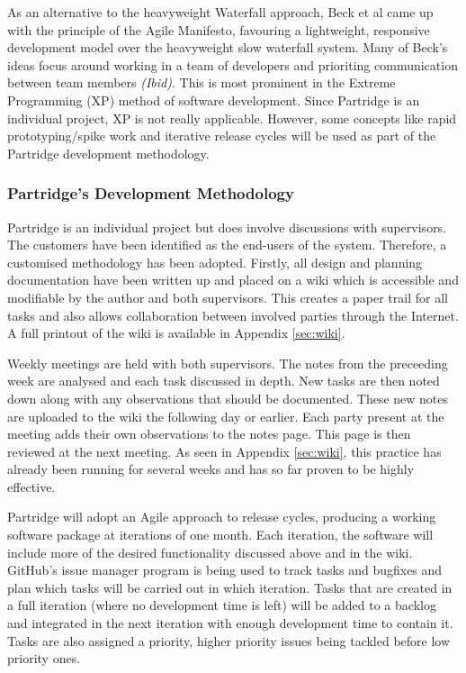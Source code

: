 \documentclass[12pt,a4paper]{article}
\begin{document}
As an alternative to the heavyweight Waterfall approach, Beck et al came up
with the principle of the Agile Manifesto, favouring a lightweight, responsive
development model over the heavyweight slow waterfall
system\cite{beck2001agile}. Many of Beck's ideas focus around working in a team
of developers and prioriting communication between team members \emph{(Ibid)}.
This is most prominent in the Extreme Programming (XP) method of software
development. Since Partridge is an individual project, XP is not really
applicable. However, some concepts like rapid prototyping/spike work and
iterative release cycles will be used as part of the Partridge development
methodology.

\subsubsection{ Partridge's Development Methodology}

Partridge is an individual project but does involve discussions with
supervisors. The customers have been identified as the end-users of the system.
Therefore, a customised methodology has been adopted. Firstly, all design and
planning documentation have been written up and placed on a wiki which is
accessible and modifiable by the author and both supervisors. This creates a
paper trail for all tasks and also allows collaboration between involved
parties through the Internet. A full printout of the wiki is available in
Appendix \ref{sec:wiki}. 

Weekly meetings are held with both supervisors. The notes from the preceeding
week are analysed and each task discussed in depth. New tasks are then noted
down along with any observations that should be documented. These new notes are
uploaded to the wiki the following day or earlier. Each party present at the
meeting adds their own observations to the notes page. This page is then
reviewed at the next meeting. As seen in Appendix \ref{sec:wiki}, this practice
has already been running for several weeks and has so far proven to be highly
effective.

Partridge will adopt an Agile approach to release cycles, producing a working
software package at iterations of one month.  Each iteration, the software will
include more of the desired functionality discussed above and in the wiki.
GitHub's issue manager program is being used to track tasks and bugfixes and
plan which tasks will be carried out in which iteration. Tasks that are created
in a full iteration (where no development time is left) will be added to a
backlog and integrated in the next iteration with enough development time to
contain it. Tasks are also assigned a priority, higher priority issues being
tackled before low priority ones.
\end{document}

